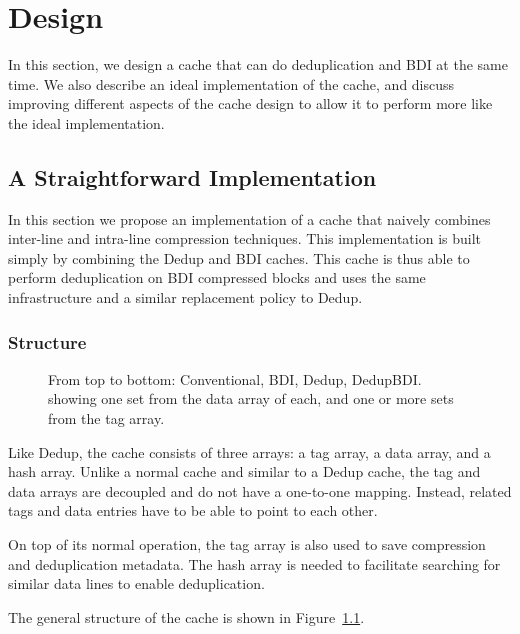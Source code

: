 
\chapter{Design}
\label{ch:Design}
In this section, we design a cache that can do deduplication and BDI at the same time. We also describe an ideal implementation of the cache, and discuss improving different aspects of the cache design to allow it to perform more like the ideal implementation.
\section{A Straightforward Implementation}
\label{sec:Straightforward Implementation}
In this section we propose an implementation of a cache that naively combines inter-line and intra-line compression techniques. This implementation is built simply by combining the Dedup and BDI caches. This cache is thus able to perform deduplication on BDI compressed blocks and uses the same infrastructure and a similar replacement policy to Dedup.

\subsection{Structure}
\label{ssec:DedupBDIStructure}
\begin{figure}
    \caption[DedupBDI Cache]{From top to bottom: Conventional, BDI, Dedup, DedupBDI. showing one set from the data array of each, and one or more sets from the tag array.}
    \label{fig:DedupBDI}
\end{figure}
Like Dedup, the cache consists of three arrays: a tag array, a data array, and a hash array. Unlike a normal cache and similar to a Dedup cache, the tag and data arrays are decoupled and do not have a one-to-one mapping. Instead, related tags and data entries have to be able to point to each other.\par
On top of its normal operation, the tag array is also used to save compression and deduplication metadata. The hash array is needed to facilitate searching for similar data lines to enable deduplication.\par
The general structure of the cache is shown in Figure~\ref{fig:DedupBDI}.
